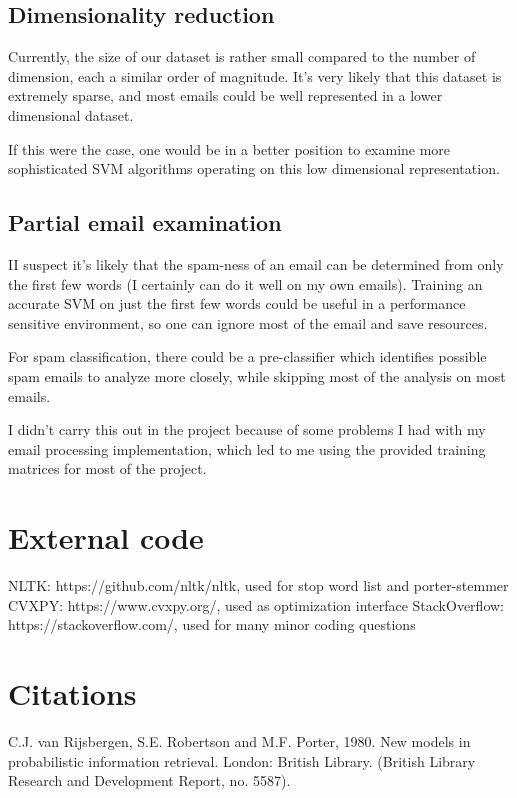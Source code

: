 \documentclass[]{article}
\begin{document}
\subsection{Dimensionality reduction}

Currently, the size of our dataset is rather small compared to the number of dimension, each a similar order of magnitude. It's very likely that this dataset is extremely sparse, and most emails could be well represented in a lower dimensional dataset.

If this were the case, one would be in a better position to examine more sophisticated SVM algorithms operating on this low dimensional representation.

\subsection{Partial email examination}

II suspect it's likely that the spam-ness of an email can be determined from only the first few words (I certainly can do it well on my own emails). Training an accurate SVM on just the first few words could be useful in a performance sensitive environment, so one can ignore most of the email and save resources.

For spam classification, there could be a pre-classifier which identifies possible spam emails to analyze more closely, while skipping most of the analysis on most emails.

I didn't carry this out in the project because of some problems I had with my email processing implementation, which led to me using the provided training matrices for most of the project.

\section{External code}

NLTK: https://github.com/nltk/nltk, used for stop word list and porter-stemmer
CVXPY: https://www.cvxpy.org/, used as optimization interface
StackOverflow: https://stackoverflow.com/, used for many minor coding questions

\section{Citations}

C.J. van Rijsbergen, S.E. Robertson and M.F. Porter, 1980. New models in probabilistic information retrieval. London: British Library. (British Library Research and Development Report, no. 5587).
\end{document}
